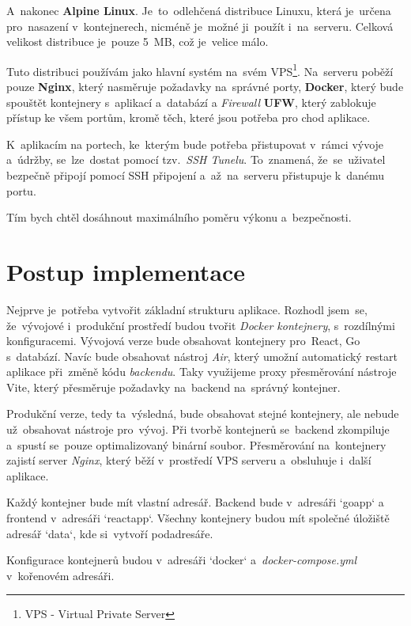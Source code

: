 \documentclass[14pt,a4paper]{article}
\begin{document}
            A~nakonec \textbf{Alpine Linux}. Je~to~odlehčená distribuce Linuxu, která je~určena pro~nasazení v~kontejnerech,
            nicméně je~možné ji~použít i~na~serveru. Celková velikost distribuce je~pouze 5~MB, což je~velice málo.

            Tuto distribuci používám jako hlavní systém na~svém VPS\footnote{VPS - Virtual Private Server}.
            Na~serveru poběží pouze \textbf{Nginx}, který nasměruje požadavky na~správné porty,
            \textbf{Docker}, který bude spouštět kontejnery s~aplikací a~databází a \emph{Firewall} \textbf{UFW}, který zablokuje přístup ke všem portům,
            kromě těch, které jsou potřeba pro chod aplikace.

            K~aplikacím na portech, ke~kterým bude potřeba přistupovat v~rámci vývoje a~údržby, se~lze~dostat pomocí tzv.~\emph{SSH Tunelu}. To~znamená, že~se~uživatel bezpečně připojí pomocí SSH připojení a~až~na~serveru přistupuje k~danému portu.

            Tím bych chtěl dosáhnout maximálního poměru výkonu a~bezpečnosti.
	
	\section{Postup implementace}
        Nejprve je~potřeba vytvořit základní strukturu aplikace. Rozhodl jsem~se, že~vývojové i~produkční prostředí budou tvořit \emph{Docker kontejnery}, s~rozdílnými konfiguracemi.
        Vývojová verze bude obsahovat kontejnery pro~React, Go s~databází. Navíc bude obsahovat nástroj \emph{Air}, který umožní automatický restart aplikace při~změně kódu \emph{backendu}. Taky využijeme proxy přesměrování nástroje Vite, který přesměruje požadavky na~backend na~správný kontejner.

        Produkční verze, tedy ta~výsledná, bude obsahovat stejné kontejnery, ale nebude už~obsahovat nástroje pro~vývoj. Při tvorbě kontejnerů se~backend zkompiluje a~spustí se~pouze optimalizovaný binární soubor.
        Přesměrování na~kontejnery zajistí server \emph{Nginx}, který běží v~prostředí VPS serveru a~obsluhuje i~další aplikace.

        Každý kontejner bude mít vlastní adresář. Backend bude v~adresáři `goapp` a frontend v~adresáři `reactapp`. Všechny kontejnery budou mít společné úložiště adresář `data`, kde si~vytvoří podadresáře.

        Konfigurace kontejnerů budou v~adresáři `docker` a~\emph{docker-compose.yml} v~kořenovém adresáři.
\end{document}
